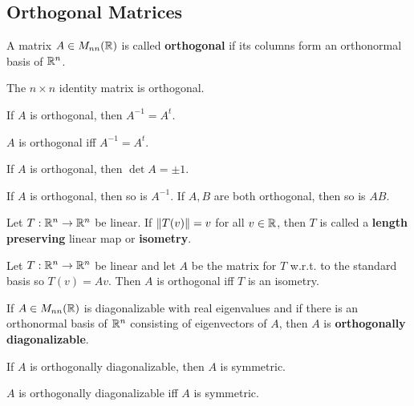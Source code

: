 \documentclass{article}
\begin{document}
\subsection{Orthogonal Matrices}
\begin{definition}
  A matrix $A \in M_{nn}(\mathbb{R})$ is called \textbf{orthogonal} if its columns form an orthonormal basis of $\mathbb{R}^n$.
\end{definition}
\begin{example}
  The $n\times n$ identity matrix is orthogonal.
\end{example}
\begin{theorem}
  If $A$ is orthogonal, then $A^{-1} = A^t$.
\end{theorem}
\begin{theorem}
  $A$ is orthogonal iff $A^{-1} = A^t$.
\end{theorem}
\begin{theorem}
  If $A$ is orthogonal, then $\det A = \pm 1$.
\end{theorem}
\begin{theorem}
  If $A$ is orthogonal, then so is $A^{-1}$. If $A, B$ are both orthogonal, then so is $AB$.
\end{theorem}
\begin{definition}
  Let $T: \mathbb{R}^n \to \mathbb{R}^n$ be linear. If $\norm{T(v)} = v$ for all $v \in \mathbb{R}$, then $T$ is called a \textbf{length preserving} linear map or \textbf{isometry}.
\end{definition}
\begin{theorem}
  Let $T: \mathbb{R}^n \to \mathbb{R}^n$ be linear and let $A$ be the matrix for $T$ w.r.t. to the standard basis so $T(v) = Av$. Then $A$ is orthogonal iff $T$ is an isometry.
\end{theorem}
\begin{definition}
  If $A \in M_{nn}(\mathbb{R})$ is diagonalizable with real eigenvalues and if there is an orthonormal basis of $\mathbb{R}^n$ consisting of eigenvectors of $A$, then $A$ is \textbf{orthogonally diagonalizable}.
\end{definition}
\begin{theorem}
  If $A$ is orthogonally diagonalizable, then $A$ is symmetric.
\end{theorem}
\begin{cthm}
  $A$ is orthogonally diagonalizable iff $A$ is symmetric.
\end{cthm}
\end{document}
